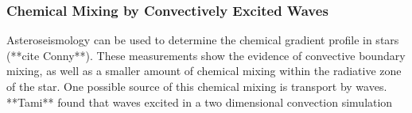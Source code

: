 {\color{purple}
\subsubsection{Chemical Mixing by Convectively Excited Waves}
}

Asteroseismology can be used to determine the chemical gradient profile in stars (**cite Conny**). These measurements show the evidence of convective boundary mixing, as well as a smaller amount of chemical mixing within the radiative zone of the star. One possible source of this chemical mixing is transport by waves. **Tami** found that waves excited in a two dimensional convection simulation 

